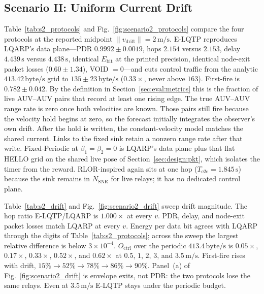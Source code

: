 \subsection{Scenario II: Uniform Current Drift}
\label{sec:eval:s2}


Table~\ref{tab:s2_protocols} and Fig.~\ref{fig:scenario2_protocols}
compare the four protocols at the reported midpoint
$\|v_{\mathrm{drift}}\|=2\,\mathrm{m/s}$.
E-LQTP reproduces LQARP's data plane---PDR $0.9992\pm 0.0019$,
hops $2.154$ versus $2.153$, delay $4.439\,\mathrm{s}$ versus
$4.438\,\mathrm{s}$, identical $E_{\mathrm{bit}}$ at the printed
precision, identical node-exit packet losses
($0.60\pm 1.34$), VOID $=0$---and cuts control traffic from the
analytic $413.42\,\mathrm{byte/s}$ grid to
$135\pm 23\,\mathrm{byte/s}$ ($0.33\times$, never above $163$).
First-fire is $0.782\pm 0.042$.
By the definition in Section~\ref{sec:eval:metrics} this is the
fraction of live AUV--AUV pairs that record at least one rising
edge.
The true AUV--AUV range rate is zero once both velocities are known.
Those pairs still fire because the velocity hold begins at zero, so
the forecast initially integrates the observer's own drift.
After the hold is written, the constant-velocity model matches the
shared current.
Links to the fixed sink retain a nonzero range rate after that
write.
Fixed-Periodic at $\beta_1=\beta_2=0$ is LQARP's data plane plus
that flat HELLO grid on the shared live pose of
Section~\ref{sec:design:pkt}, which isolates the timer from the
reward.
RLOR-inspired again sits at one hop ($T_{\mathrm{e2e}}=1.845\,\mathrm{s}$)
because the sink remains in $N_{\mathrm{SNR}}$ for live relays; it
has no dedicated control plane.



Table~\ref{tab:s2_drift} and Fig.~\ref{fig:scenario2_drift} sweep
drift magnitude.
The hop ratio E-LQTP/LQARP is $1.000\times$ at every $v$.
PDR, delay, and node-exit packet losses match LQARP at every $v$.
Energy per data bit agrees with LQARP through the digits of
Table~\ref{tab:s2_protocols}; across the sweep the largest
relative difference is below $3\times 10^{-4}$.
$O_{\mathrm{ctrl}}$ over the periodic $413.4\,\mathrm{byte/s}$ is
$0.05\times$, $0.17\times$, $0.33\times$, $0.52\times$, and
$0.62\times$ at $0.5$, $1$, $2$, $3$, and $3.5\,\mathrm{m/s}$.
First-fire rises with drift, $15\%\to 52\%\to 78\%\to 86\%\to 90\%$.
Panel~(a) of Fig.~\ref{fig:scenario2_drift} is envelope exits, not
PDR: the two protocols lose the same relays.
Even at $3.5\,\mathrm{m/s}$ E-LQTP stays under the periodic budget.


